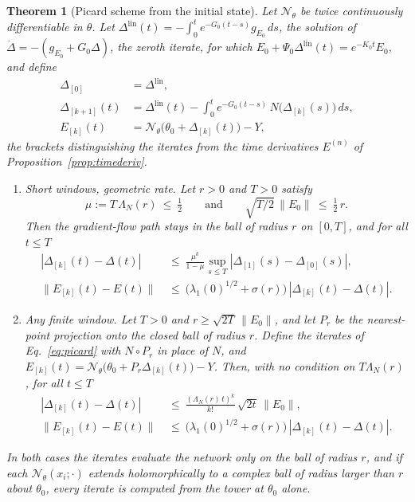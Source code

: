 \documentclass[11pt]{article}
\newtheorem{theorem}{Theorem}
\theoremstyle{definition}
\theoremstyle{remark}
\newcommand{\Net}{\mathcal{N}_\theta}    %
\begin{document}
\begin{theorem}[Picard scheme from the initial state]\label{thm:picard}
Let $\Net$ be twice continuously differentiable in $\theta$.
Let $\Delta^{\mathrm{lin}}(t) = -\int_0^te^{-G_0(t-s)}g_{E_0}\,ds$, the solution of $\dot\Delta = -(g_{E_0} + G_0\Delta)$, the zeroth iterate, for which $E_0 + \Psi_0\Delta^{\mathrm{lin}}(t) = e^{-K_0t}E_0$, and define
\begin{equation}\label{eq:picard}
\begin{aligned}
\Delta_{[0]} &= \Delta^{\mathrm{lin}},\\
\Delta_{[k+1]}(t) &= \Delta^{\mathrm{lin}}(t) - \int_0^te^{-G_0(t-s)}\,N\big(\Delta_{[k]}(s)\big)\,ds,\\
E_{[k]}(t) &= \Net\big(\theta_0 + \Delta_{[k]}(t)\big) - Y ,
\end{aligned}
\end{equation}
the brackets distinguishing the iterates from the time derivatives $E^{(n)}$ of Proposition~\ref{prop:timederiv}.
\begin{enumerate}[label=(\alph*)]
\item \emph{Short windows, geometric rate.} Let $r > 0$ and $T > 0$ satisfy
\begin{equation}\label{eq:picardcond}
\mu := T\,\Lambda_N(r)\ \le\ \tfrac12\qquad\text{and}\qquad \sqrt{T/2}\,\|E_0\|\ \le\ \tfrac12\,r .
\end{equation}
Then the gradient-flow path stays in the ball of radius $r$ on $[0,T]$, and for all $t\le T$
\begin{equation}\label{eq:picardconv}
\begin{aligned}
|\Delta_{[k]}(t) - \Delta(t)|\ &\le\ \frac{\mu^k}{1 - \mu}\sup_{s\le T}|\Delta_{[1]}(s) - \Delta_{[0]}(s)|,\\
\|E_{[k]}(t) - E(t)\|\ &\le\ \big(\lambda_1(0)^{1/2} + \sigma(r)\big)\,|\Delta_{[k]}(t) - \Delta(t)| .
\end{aligned}
\end{equation}
\item \emph{Any finite window.} Let $T > 0$ and $r\ge\sqrt{2T}\,\|E_0\|$, and let $P_r$ be the nearest-point projection onto the closed ball of radius $r$.
Define the iterates of Eq.~\eqref{eq:picard} with $N\circ P_r$ in place of $N$, and $E_{[k]}(t) = \Net\big(\theta_0 + P_r\Delta_{[k]}(t)\big) - Y$.
Then, with no condition on $T\Lambda_N(r)$, for all $t\le T$
\begin{equation}\label{eq:picardany}
\begin{aligned}
|\Delta_{[k]}(t) - \Delta(t)|\ &\le\ \frac{(\Lambda_N(r)\,t)^k}{k!}\,\sqrt{2t}\,\|E_0\|,\\
\|E_{[k]}(t) - E(t)\|\ &\le\ \big(\lambda_1(0)^{1/2} + \sigma(r)\big)\,|\Delta_{[k]}(t) - \Delta(t)| .
\end{aligned}
\end{equation}
\end{enumerate}
In both cases the iterates evaluate the network only on the ball of radius $r$, and if each $\Net(x_i;\cdot)$ extends holomorphically to a complex ball of radius larger than $r$ about $\theta_0$, every iterate is computed from the tower at $\theta_0$ alone.
\end{theorem}
\end{document}
